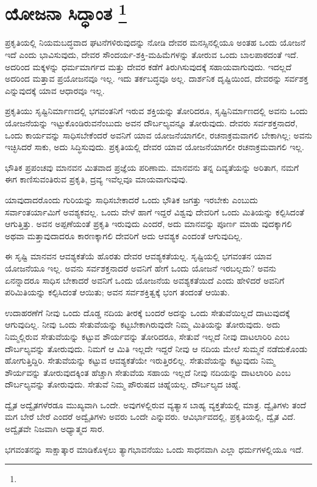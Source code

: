 
\chapter[ಯೋಜನಾ ಸಿದ್ಧಾಂತ ]{ಯೋಜನಾ ಸಿದ್ಧಾಂತ \protect\footnote{}}

ಪ್ರಕೃತಿಯಲ್ಲಿ ನಿಯಮಬದ್ಧವಾದ ಘಟನೆಗಳಿರುವುದನ್ನು ನೋಡಿ ದೇವರ ಮನಸ್ಸಿನಲ್ಲಿಯೂ ಅಂತಹ ಒಂದು ಯೋಜನೆ ಇದೆ ಎಂದು ಭಾವಿಸುವುದು, ದೇವರ ಸೌಂದರ್ಯ-ಶಕ್ತಿ-ಮಹಿಮೆಗಳನ್ನು ತೋರುವ ಒಂದು ಬಾಲಪಾಠದಂತೆ ಇದೆ. ಅದರಿಂದ ಮಕ್ಕಳನ್ನು ಧರ್ಮಮಾರ್ಗದ ಮತ್ತು ದೇವರ ಕಡೆಗೆ ತಿರುಗಿಸುವುದಕ್ಕೆ ಸಹಾಯವಾಗುವುದು. ಇದಲ್ಲದೆ ಅದರಿಂದ ಮತ್ತಾವ ಪ್ರಯೋಜನವೂ ಇಲ್ಲ. ಇದು ತರ್ಕಬದ್ಧವೂ ಅಲ್ಲ. ದಾರ್ಶನಿಕ ದೃಷ್ಟಿಯಿಂದ, ದೇವರನ್ನು ಸರ್ವಶಕ್ತ ಎನ್ನುವುದಕ್ಕೆ ಯಾವ ಆಧಾರವೂ ಇಲ್ಲ.

ಪ್ರಕೃತಿಯು ಸೃಷ್ಟಿನಿರ್ಮಾಣದಲ್ಲಿ ಭಗವಂತನಿಗೆ ಇರುವ ಶಕ್ತಿಯನ್ನು ತೋರಿದರೂ, ಸೃಷ್ಟಿನಿರ್ಮಾಣದಲ್ಲಿ ಅವನು ಒಂದು ಯೋಜನೆಯನ್ನು ಇಟ್ಟುಕೊಂಡಿರುವನೆಂಬುದು ಅವನ ದೌರ್ಬಲ್ಯವನ್ನೂ ತೋರುವುದು. ದೇವರು ಸರ್ವಶಕ್ತನಾದರೆ, ಒಂದು ಕಾರ್ಯವನ್ನು ಸಾಧಿಸಬೇಕೆಂದರೆ ಅವನಿಗೆ ಯಾವ ಯೋಜನೆಯಾಗಲೀ, ರಚನಾಕ್ರಮವಾಗಲಿ ಬೇಕಾಗಿಲ್ಲ; ಅವನು ಇಚ್ಛಿಸಿದರೆ ಸಾಕು, ಅದು ಸಿದ್ಧಿಸುವುದು. ಪ್ರಕೃತಿಯಲ್ಲಿ ದೇವರ ಯಾವ ಯೋಜನೆಯಾಗಲೀ ರಚನಾಕ್ರಮವಾಗಲಿ ಇಲ್ಲ.

ಭೌತಿಕ ಪ್ರಪಂಚವು ಮಾನವನ ಮಿತವಾದ ಪ್ರಜ್ಞೆಯ ಪರಿಣಾಮ. ಮಾನವನು ತನ್ನ ದಿವ್ಯತೆಯನ್ನು ಅರಿತಾಗ, ನಮಗೆ ಈಗ ಕಾಣಿಸುವಂತಿರುವ ಪ್ರಕೃತಿ, ದ್ರವ್ಯ ಇವೆಲ್ಲವೂ ಮಾಯವಾಗುವುವು.

ಯಾವುದಾದರೊಂದು ಗುರಿಯನ್ನು ಸಾಧಿಸಬೇಕಾದರೆ ಒಂದು ಭೌತಿಕ ಜಗತ್ತು ಇರಬೇಕು ಎಂಬುದು ಸರ್ವಾಂತರ್ಯಾಮಿಗೆ ಅವಶ್ಯಕವಲ್ಲ. ಒಂದು ವೇಳೆ ಹಾಗೆ ಇದ್ದರೆ ವಿಶ್ವವು ದೇವರಿಗೆ ಒಂದು ಮಿತಿಯನ್ನು ಕಲ್ಪಿಸಿದಂತೆ ಆಗುತ್ತಿತ್ತು. ಅವನ ಅಪ್ಪಣೆಯಂತೆ ಪ್ರಕೃತಿ ಇರುವುದು ಎಂದರೆ, ಅದು ಮಾನವನ್ನು ಪೂರ್ಣ ಮಾಡು ವುದಕ್ಕಾಗಲಿ ಅಥವಾ ಮತ್ತಾವುದಾದರೂ ಕಾರಣಕ್ಕಾಗಲಿ ದೇವರಿಗೆ ಅದು ಆವಶ್ಯಕ ಎಂದಂತೆ ಆಗುವುದಿಲ್ಲ.

ಈ ಸೃಷ್ಟಿ ಮಾನವನ ಆವಶ್ಯಕತೆಯೆ ಹೊರತು ದೇವರ ಆವಶ್ಯಕತೆಯಲ್ಲ. ಸೃಷ್ಟಿಯಲ್ಲಿ ಭಗವಂತನ ಯಾವ ಯೋಜನೆಯೂ ಇಲ್ಲ. ಅವನು ಸರ್ವಶಕ್ತನಾದರೆ ಅವನಿಗೆ ಹೇಗೆ ಒಂದು ಯೋಜನೆ ಇರಬಲ್ಲದು? ಅವನು ಏನನ್ನಾದರೂ ಸಾಧಿಸ ಬೇಕಾದರೆ ಅವನಿಗೆ ಒಂದು ಯೋಜನೆಯ ಅವಶ್ಯಕತೆಯಿದೆ ಎಂದು ಹೇಳಿದರೆ ಅವನಿಗೆ ಪರಿಮಿತಿಯನ್ನು ಕಲ್ಪಿಸಿದಂತೆ ಆಯಿತು; ಅವನ ಸರ್ವಶಕ್ತಿತ್ವಕ್ಕೆ ಭಂಗ ತಂದಂತೆ ಆಯಿತು.

ಉದಾಹರಣೆಗೆ ನೀವು ಒಂದು ದೊಡ್ಡ ನದಿಯ ತೀರಕ್ಕೆ ಬಂದರೆ ಅದನ್ನು ಒಂದು ಸೇತುವೆಯಿಲ್ಲದೆ ದಾಟುವುದಕ್ಕೆ ಆಗುವುದಿಲ್ಲ. ನೀವು ಒಂದು ಸೇತುವೆಯನ್ನು ಕಟ್ಟಬೇಕಾಗಿರುವುದೇ ನಿಮ್ಮ ಮಿತಿಯನ್ನು ತೋರುವುದು. ಅದು ನಿಮ್ಮಲ್ಲಿರುವ ಸೇತುವೆಯನ್ನು ಕಟ್ಟುವ ಶೌರ್ಯವನ್ನು ತೋರಿದರೂ, ಸೇತುವೆ ಇಲ್ಲದೆ ನೀವು ದಾಟಲಾರಿರಿ ಎಂಬ ದೌರ್ಬಲ್ಯವನ್ನು ತೋರುವುದು. ನಿಮಗೆ ಆ ಮಿತಿ ಇಲ್ಲದೇ ಇದ್ದರೆ ನೀವು ಆ ನದಿಯ ಮೇಲೆ ಸುಮ್ಮನೆ ನಡೆದುಕೊಂಡು ಹೋಗುತ್ತಿದ್ದಿರಿ. ಸೇತುವೆಯನ್ನು ಕಟ್ಟುವ ಆವಶ್ಯಕತೆಯೇ ಇರುತ್ತಿರಲಿಲ್ಲ. ಸೇತುವೆಯನ್ನು ಕಟ್ಟುವುದು ನಿಮ್ಮ ಶೌರ್ಯವನ್ನು ತೋರುವುದಕ್ಕಿಂತ ಹೆಚ್ಚಾಗಿ ಸೇತುವೆಯ ಸಹಾಯ ಇಲ್ಲದೆ ನೀವು ನದಿಯನ್ನು ದಾಟಲಾರಿರಿ ಎಂಬ ದೌರ್ಬಲ್ಯವನ್ನು ತೋರುವುದು. ಸೇತುವೆ ನಿಮ್ಮ ಪೌರುಷದ ಚಿಹ್ನೆಯಲ್ಲ. ದೌರ್ಬಲ್ಯದ ಚಿಹ್ನೆ.

ದ್ವೈತ ಅದ್ವೈತಗಳೆರಡೂ ಮುಖ್ಯವಾಗಿ ಒಂದೇ. ಅವುಗಳಲ್ಲಿರುವ ವ್ಯತ್ಯಾಸ ಬಾಹ್ಯ ವ್ಯಕ್ತತೆಯಲ್ಲಿ ಮಾತ್ರ. ದ್ವೈತಿಗಳು ತಂದೆ ಮಗ ಬೇರೆ ಬೇರೆ ಎಂದರೆ ಅದ್ವೈತಿಗಳು ಅವರು ಒಂದೇ ಎನ್ನುವರು. ಆವಿರ್ಭಾವದಲ್ಲಿ, ಪ್ರಕೃತಿಯಲ್ಲಿ, ದ್ವೈತ ವಿದೆ. ಅದ್ವೈತವೇ ನಿಜವಾಗಿ ಅಧ್ಯಾತ್ಮದ ಸಾರ.

ಭಗವಂತನನ್ನು ಸಾಕ್ಷಾತ್ಕಾರ ಮಾಡಿಕೊಳ್ಳಲು ತ್ಯಾಗಭಾವನೆಯು ಒಂದು ಸಾಧನವಾಗಿ ಎಲ್ಲಾ ಧರ್ಮಗಳಲ್ಲಿಯೂ ಇದೆ.


